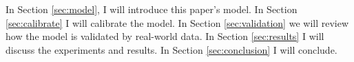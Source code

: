 \documentclass[letter, 12pt, epsf,leqno]{article}
\begin{document}
 In Section \ref{sec:model}, I will introduce this paper's model.  In Section \ref{sec:calibrate} I will calibrate the model.  In Section \ref{sec:validation} we will review how the model is validated by real-world data.  In Section \ref{sec:results} I will discuss the experiments and results.  In Section \ref{sec:conclusion} I will conclude.  %


%
%
%
%
%
%
%
\end{document}
